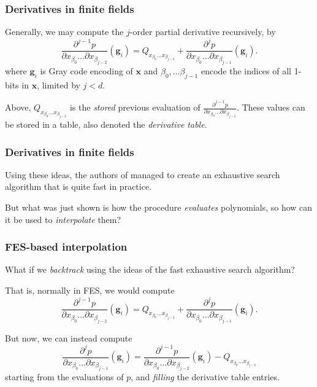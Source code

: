 \documentclass{beamer}
\begin{document}
\begin{frame}
    \frametitle{Derivatives in finite fields}
    Generally, we may compute the $j$-order partial derivative recursively, by 
    $$
        \frac{\partial^{j - 1} p}{\partial x_{\beta_0} \dots \partial x_{\beta_{j - 2}}}(\mathbf{g}_i) = Q_{x_{\beta_0} \dots x_{\beta_{j - 2}}} + \frac{\partial^j p}{\partial x_{\beta_0} \dots \partial x_{\beta_{j - 1}}}(\mathbf{g}_i).
    $$
    where $\mathbf{g}_i$ is Gray code encoding of $\mathbf{x}$ and $\beta_0, \dots \beta_{j - 1}$ encode the indices of all 1-bits in $\mathbf{x}$, limited by $j < d$.
    
    Above, $Q_{x_{\beta_0} \dots x_{\beta_{j - 2}}}$ is the \textit{stored} previous evaluation of $\frac{\partial^{j - 1} p}{\partial x_{\beta_0} \dots \partial x_{\beta_{j - 2}}}$. These values can be stored in a table, also denoted the \textit{derivative table}.
\end{frame}

\begin{frame}
    \frametitle{Derivatives in finite fields}
    Using these ideas, the authors of \cite{ches-2010-23990} managed to create an exhaustive search algorithm that is quite fast in practice.

    But what was just shown is how the procedure \textit{evaluates} polynomials, so how can it be used to \textit{interpolate} them?
\end{frame}

\begin{frame}
    \frametitle{FES-based interpolation}
    What if we \textit{backtrack} using the ideas of the fast exhaustive search algorithm?

    \pause

    That is, normally in FES, we would compute 
    $$
        \frac{\partial^{j - 1} p}{\partial x_{\beta_0} \dots \partial x_{\beta_{j - 2}}}(\mathbf{g}_i) = Q_{x_{\beta_0} \dots x_{\beta_{j - 2}}} + \frac{\partial^j p}{\partial x_{\beta_0} \dots \partial x_{\beta_{j - 1}}}(\mathbf{g}_i).
    $$
    
    \pause

    But now, we can instead compute 
    $$
        \frac{\partial^j p}{\partial x_{\beta_0} \dots \partial x_{\beta_{j - 1}}}(\mathbf{g}_i) = \frac{\partial^{j - 1} p}{\partial x_{\beta_0} \dots \partial x_{\beta_{j - 2}}}(\mathbf{g}_i) - Q_{x_{\beta_0} \dots x_{\beta_{j - 2}}}
    $$
    starting from the evaluations of $p$, and \textit{filling} the derivative table entries. 
\end{frame}
\end{document}
